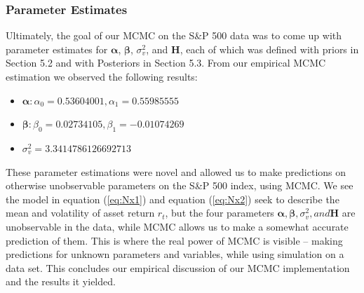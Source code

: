 \documentclass[letterpaper]{article}
\begin{document}
\subsubsection{Parameter Estimates}
Ultimately, the goal of our MCMC on the S\&P 500 data was to come up with parameter estimates for $\bm{\alpha}$, $\bm{\beta}$, $\sigma_{v}^2$, and $\bm{H}$, each of which was defined with priors in Section 5.2 and with Posteriors in Section 5.3. From our empirical MCMC estimation we observed the following results:
\begin{itemize}
\item $\bm{\alpha}: \alpha_{0} = 0.53604001, \alpha_{1} = 0.55985555$
\item $\bm{\beta}: \beta_{0} = 0.02734105, \beta_{1} = -0.01074269$
\item $\sigma_{v}^2 = 3.3414786126692713$
\end{itemize}
These parameter estimations were novel and allowed us to make predictions on otherwise unobservable parameters on the S\&P 500 index, using MCMC. We see the model in equation (\ref{eq:Nx1}) and equation (\ref{eq:Nx2}) seek to describe the mean and volatility of asset return $r_t$, but the four parameters $\bm{\alpha}, \bm{\beta}, \sigma_{v}^2, and \bm{H}$ are unobservable in the data, while MCMC allows us to make a somewhat accurate prediction of them. This is where the real power of MCMC is visible -- making predictions for unknown parameters and variables, while using simulation on a data set. This concludes our empirical discussion of our MCMC implementation and the results it yielded. 
\end{document}
